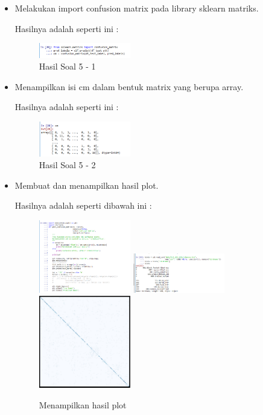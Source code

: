 \begin{enumerate}
\begin{itemize}
	\item Melakukan import confusion matrix pada library sklearn matriks.
	
	Hasilnya adalah seperti ini :

	\begin{figure}[H]
	\centering
		\includegraphics[width=4cm]{figures/1174086/3/soal51.PNG}
		\caption{Hasil Soal 5 - 1}
	\end{figure}

	\item Menampilkan isi cm dalam bentuk matrix yang berupa array.
	
	Hasilnya adalah seperti ini :

	\begin{figure}[H]
	\centering
		\includegraphics[width=4cm]{figures/1174086/3/soal52.PNG}
		\caption{Hasil Soal 5 - 2}
	\end{figure}

	\item Membuat dan menampilkan hasil plot.
	
	Hasilnya adalah seperti dibawah ini :
	\begin{figure}[H]
	\centering
		\includegraphics[width=4cm]{figures/1174086/3/soal5_3.PNG}
		\includegraphics[width=4cm]{figures/1174086/3/soal56.PNG}
		\includegraphics[width=4cm]{figures/1174086/3/2.PNG}
		\caption{Menampilkan hasil plot}
	\end{figure}


\end{itemize}
\end{enumerate}
